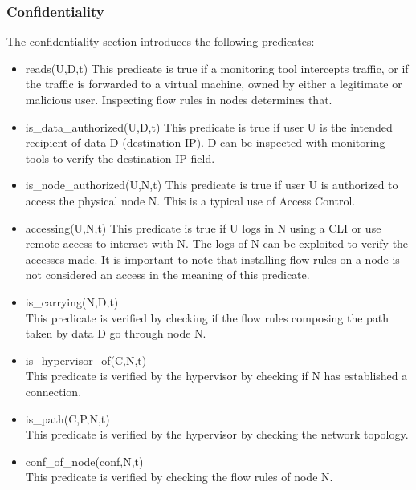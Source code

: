 \subsubsection{Confidentiality}
The confidentiality section introduces the following predicates:
\begin{itemize}
\item reads(U,D,t)
\newline
This predicate is true if a monitoring tool intercepts traffic, or if the traffic is forwarded to a virtual machine, owned by either a legitimate or malicious user. Inspecting flow rules in nodes determines that. 

\item is\_data\_authorized(U,D,t)
\newline
This predicate is true if user U is the intended recipient of data D (\eg destination IP).
D can be inspected with monitoring tools to verify the destination IP field.
\item is\_node\_authorized(U,N,t)
\newline
This predicate is true if user U is authorized to access the physical node N.
This is a typical use of Access Control.
\item accessing(U,N,t)
\newline
This predicate is true if U logs in N using a CLI or use remote access to interact with N.
The logs of N can be exploited to verify the accesses made.
It is important to note that installing flow rules on a node is not considered an access in the meaning of this predicate.

\item is\_carrying(N,D,t)\\
This predicate is verified by checking if the flow rules composing the path taken by data D go through node N.

\item is\_hypervisor\_of(C,N,t)\\
This predicate is verified by the hypervisor by checking if N has established a connection.

\item is\_path(C,P,N,t)\\
This predicate  is verified by the hypervisor by checking the network topology.

\item conf\_of\_node(conf,N,t)\\
This predicate  is verified by checking the flow rules of node N.

\end{itemize}

